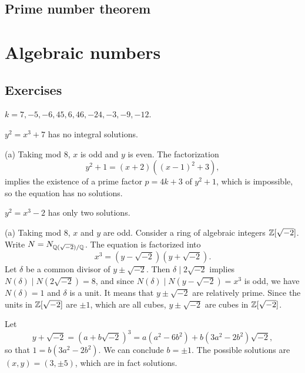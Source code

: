 \documentclass{../../large}
\begin{document}
\section{Prime number theorem}



\chapter{Algebraic numbers}




\section*{Exercises}
\begin{prb}
$k=7,-5,-6,45,6,46,-24,-3,-9,-12$.
\begin{parts}
\item $y^2=x^3+7$ has no integral solutions.
\end{parts}
\end{prb}
\begin{pf}
(a)
Taking mod 8, $x$ is odd and $y$ is even.
The factorization
\[y^2+1=(x+2)((x-1)^2+3),\]
implies the existence of a prime factor $p=4k+3$ of $y^2+1$, which is impossible, so the equation has no solutions.
\end{pf}

\begin{prb}
\begin{parts}
\item $y^2=x^3-2$ has only two solutions.
\end{parts}
\end{prb}
\begin{pf}
(a)
Taking mod 8, $x$ and $y$ are odd.
Consider a ring of algebraic integers $\mathbb{Z}[\sqrt{-2}]$.
Write $N=N_{\mathbb{Q}(\sqrt{-2})/\mathbb{Q}}$.
The equation is factorized into
\[x^3=(y-\sqrt{-2})(y+\sqrt{-2}).\]
Let $\delta$ be a common divisor of $y\pm\sqrt{-2}$.
Then $\delta\mid 2\sqrt{-2}$ implies $N(\delta)\mid N(2\sqrt{-2})=8$, and since $N(\delta)\mid N(y-\sqrt{-2})=x^3$ is odd, we have $N(\delta)=1$ and $\delta$ is a unit.
It means that $y\pm\sqrt{-2}$ are relatively prime.
Since the units in $\mathbb{Z}[\sqrt{-2}]$ are $\pm1$, which are all cubes, $y\pm\sqrt{-2}$ are cubes in $\mathbb{Z}[\sqrt{-2}]$.

Let
\[y+\sqrt{-2}=(a+b\sqrt{-2})^3=a(a^2-6b^2)+b(3a^2-2b^2)\sqrt{-2},\]
so that $1=b(3a^2-2b^2)$.
We can conclude $b=\pm1$.
The possible solutions are $(x,y)=(3,\pm5)$, which are in fact solutions.
\end{pf}
\end{document}
